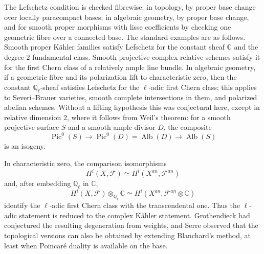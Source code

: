 \documentclass[11pt]{article}
\DeclareMathOperator{\Pic}{Pic}
\DeclareMathOperator{\Alb}{Alb}
\newcommand{\cF}{\mathcal F}
\newcommand{\C}{\mathbb C}
\newcommand{\Ql}{\mathbb Q_\ell}
\begin{document}
The Lefschetz condition is checked fibrewise: in topology, by proper base change over locally paracompact bases; in algebraic geometry, by proper base change, and for smooth proper morphisms with lisse coefficients by checking one geometric fibre over a connected base. The standard examples are as follows. Smooth proper Kähler families satisfy Lefschetz for the constant sheaf $\C$ and the degree-$2$ fundamental class. Smooth projective complex relative schemes satisfy it for the first Chern class of a relatively ample line bundle. In algebraic geometry, if a geometric fibre and its polarization lift to characteristic zero, then the constant $\Ql$-sheaf satisfies Lefschetz for the $\ell$-adic first Chern class; this applies to Severi--Brauer varieties, smooth complete intersections in them, and polarized abelian schemes. Without a lifting hypothesis this was conjectural here, except in relative dimension $2$, where it follows from Weil's theorem: for a smooth projective surface $S$ and a smooth ample divisor $D$, the composite
\[
\Pic^0(S)\longrightarrow\Pic^0(D)=\Alb(D)\longrightarrow\Alb(S)
\]
is an isogeny.

In characteristic zero, the comparison isomorphisms
\begin{equation}\tag{2.7.2}
H^i(X,\cF)\simeq H^i(X^{an},\cF^{an})
\end{equation}
and, after embedding $\Ql$ in $\C$,
\begin{equation}\tag{2.7.3}
H^i(X,\cF)\otimes_{\Ql}\C\simeq H^i(X^{an},\cF^{an}\otimes\C)
\end{equation}
identify the $\ell$-adic first Chern class with the transcendental one. Thus the $\ell$-adic statement is reduced to the complex Kähler statement. Grothendieck had conjectured the resulting degeneration from weights, and Serre observed that the topological versions can also be obtained by extending Blanchard's method, at least when Poincaré duality is available on the base.
\end{document}
